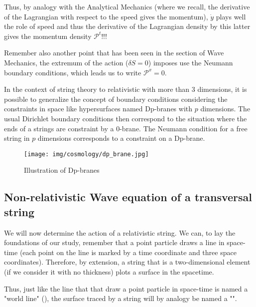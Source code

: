 	Thus, by analogy with the Analytical Mechanics (where we recall, the derivative of the Lagrangian with respect to the speed gives the momentum), $\dot{y}$ plays well the role of speed and thus the derivative of the Lagrangian density by this latter gives the momentum density $\mathcal{P}^t$!!!
	
	Remember also another point that has been seen in the section of Wave Mechanics, the extremum of the action ($\delta S=0$) imposes use the Neumann boundary conditions, which leads us to write $\mathcal{P}^x=0$.
	\begin{tcolorbox}[title=Remark,colframe=black,arc=10pt]
	In the context of string theory to relativistic with more than 3 dimensions, it is possible to generalize the concept of boundary conditions considering the constraints in space like hypersurfaces named Dp-branes with $p$ dimensions. The usual Dirichlet boundary conditions then correspond to the situation where the ends of a strings are constraint by a 0-brane. The Neumann condition for a free string in $p$ dimensions corresponds to a constraint on a Dp-brane.
	\begin{figure}[H]
		\begin{center}
		\texttt{[image: img/cosmology/dp\_brane.jpg]}
		\end{center}	
		\caption[]{Illustration of Dp-branes}
	\end{figure}
	\end{tcolorbox}
	
	\subsection{Non-relativistic Wave equation of a transversal string}
	We will now determine the action of a relativistic string. We can, to lay the foundations of our study, remember that a point particle draws a line in space-time (each point on the line is marked by a time coordinate and three space coordinates). Therefore, by extension, a string that is a two-dimensional element (if we consider it with no thickness) plots a surface in the spacetime.
	
	Thus, just like the line that that draw a point particle in space-time is named a "world line" (), the surface traced by a string will by analogy be named a "".
	

